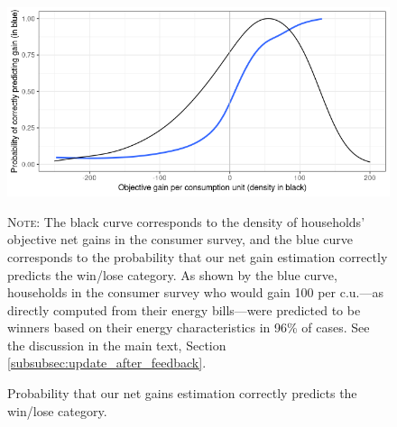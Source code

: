 \documentclass[12pt]{article} %
\begin{document}
\begin{appendices}




\begin{figure}[H]
\centering
\includegraphics[width=0.85\columnwidth]{Images/prob_correct_prediction.png} \\[-1ex]
{\footnotesize \parbox[t]{15.5cm } {\linespread{1.2}\selectfont \textsc{Note:} The black curve corresponds to the density of households' objective net gains in the consumer survey, and the blue curve corresponds to the probability that our net gain estimation correctly predicts the win/lose category. As shown by the blue curve, households in the consumer survey who would gain 100\euros{} per c.u.---as directly computed from their energy bills---were predicted to be winners based on their energy characteristics in 96\% of cases. See the discussion in the main text, Section \vref{subsubsec:update_after_feedback}.}
\caption{Probability that our net gains estimation correctly predicts the win/lose category.\label{fig:proba_pred}}} %
\end{figure}


\end{appendices}
\end{document}
